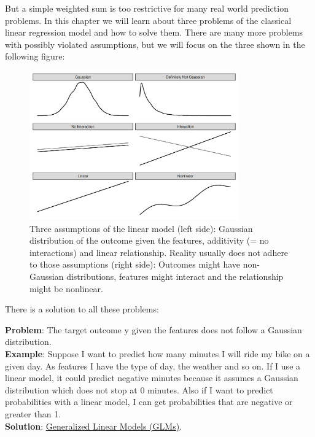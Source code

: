 \documentclass[
  10pt,
]{scrbook}
\begin{document}
But a simple weighted sum is too restrictive for many real world prediction problems.
In this chapter we will learn about three problems of the classical linear regression model and how to solve them.
There are many more problems with possibly violated assumptions, but we will focus on the three shown in the following figure:

\begin{figure}

{\centering \includegraphics[width=0.8\textwidth]{images/three-lm-problems-1} 

}

\caption{Three assumptions of the linear model (left side): Gaussian distribution of the outcome given the features, additivity (= no interactions) and linear relationship. Reality usually does not adhere to those assumptions (right side): Outcomes might have non-Gaussian distributions, features might interact and the relationship might be nonlinear.}\label{fig:three-lm-problems}
\end{figure}

There is a solution to all these problems:

\textbf{Problem}: The target outcome y given the features does not follow a Gaussian distribution.\\
\textbf{Example}: Suppose I want to predict how many minutes I will ride my bike on a given day.
As features I have the type of day, the weather and so on.
If I use a linear model, it could predict negative minutes because it assumes a Gaussian distribution which does not stop at 0 minutes.
Also if I want to predict probabilities with a linear model, I can get probabilities that are negative or greater than 1.\\
\textbf{Solution}: \protect\hyperlink{glm}{Generalized Linear Models (GLMs)}.
\end{document}
